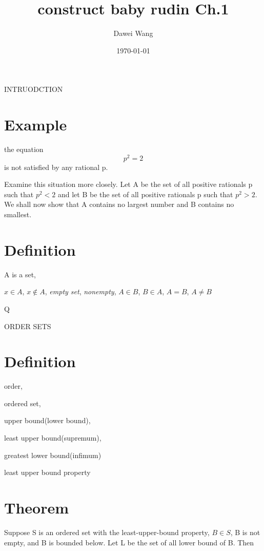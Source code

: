 \documentclass{article}
\date{\today}
\title{construct baby rudin Ch.1}
\author{Dawei Wang}
\theoremstyle{definition}
\theoremstyle{remark}
\begin{document}
	\maketitle
INTRUODCTION 
\section*{Example}
the equation 
\[
p^2=2
\]
is not satisfied by any rational p.

\hspace{\fill}

Examine this situation more closely. Let A be the set of all positive rationals p such that $p^2<2$ and let B be the set of all positive rationals p such that $p^2>2$. We shall now show that A contains no largest number and B contains no smallest.

\section*{Definition}\noindent

A is a set, 

$x\in A$, $x\notin A$, \textit{empty set}, \textit{nonempty}, 		$A\in B$, $B\in A$, $A=B$, $A\ne B$

\hspace{\fill}

Q

\hspace{\fill}

ORDER SETS

\section*{Definition}\noindent

order, 

ordered set, 

upper bound(lower bound), 

least upper bound(supremum), 

greatest lower bound(infimum)

least upper bound property

\section*{Theorem}

Suppose S is an ordered set with the least-upper-bound property, $B\in S$, B is not empty, and B is bounded below. Let L be the set of all lower bound of B. Then 
\end{document}
